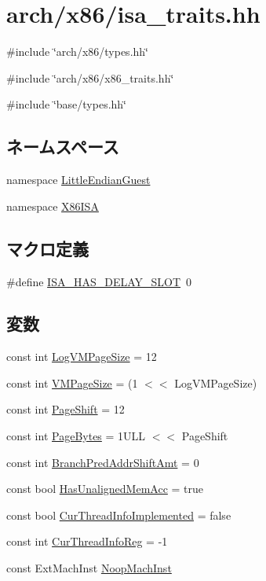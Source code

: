 \hypertarget{x86_2isa__traits_8hh}{
\section{arch/x86/isa\_\-traits.hh}
\label{x86_2isa__traits_8hh}
}
{\ttfamily \#include \char`\"{}arch/x86/types.hh\char`\"{}}\par
{\ttfamily \#include \char`\"{}arch/x86/x86\_\-traits.hh\char`\"{}}\par
{\ttfamily \#include \char`\"{}base/types.hh\char`\"{}}\par
\subsection*{ネームスペース}
\begin{DoxyCompactItemize}
\item 
namespace \hyperlink{namespaceLittleEndianGuest}{LittleEndianGuest}
\item 
namespace \hyperlink{namespaceX86ISA}{X86ISA}
\end{DoxyCompactItemize}
\subsection*{マクロ定義}
\begin{DoxyCompactItemize}
\item 
\#define \hyperlink{x86_2isa__traits_8hh_aae21ac6833454e7ead9810c372658afc}{ISA\_\-HAS\_\-DELAY\_\-SLOT}~0
\end{DoxyCompactItemize}
\subsection*{変数}
\begin{DoxyCompactItemize}
\item 
const int \hyperlink{namespaceX86ISA_a554fef169d109a5ccb7ce0dd6a43e521}{LogVMPageSize} = 12
\item 
const int \hyperlink{namespaceX86ISA_a891eaf95159d764e6efae501c2860a3a}{VMPageSize} = (1 $<$$<$ LogVMPageSize)
\item 
const int \hyperlink{namespaceX86ISA_a500ead3838797254da115aeeff14aaa5}{PageShift} = 12
\item 
const int \hyperlink{namespaceX86ISA_a7a804a2139c455999786dede70a4467b}{PageBytes} = 1ULL $<$$<$ PageShift
\item 
const int \hyperlink{namespaceX86ISA_a518c446960e93d236b89246eabc20298}{BranchPredAddrShiftAmt} = 0
\item 
const bool \hyperlink{namespaceX86ISA_a1c3adbc67ce574fe545e332d3bc677be}{HasUnalignedMemAcc} = true
\item 
const bool \hyperlink{namespaceX86ISA_a9faf3aac879cfa867d4ae15d4119c45e}{CurThreadInfoImplemented} = false
\item 
const int \hyperlink{namespaceX86ISA_a7e5bf2f33f34327efc1eeccbb0c1141f}{CurThreadInfoReg} = -\/1
\item 
const ExtMachInst \hyperlink{namespaceX86ISA_a8d1e39e0ea757dcc9725c6ccd81dd4c4}{NoopMachInst}
\end{DoxyCompactItemize}


